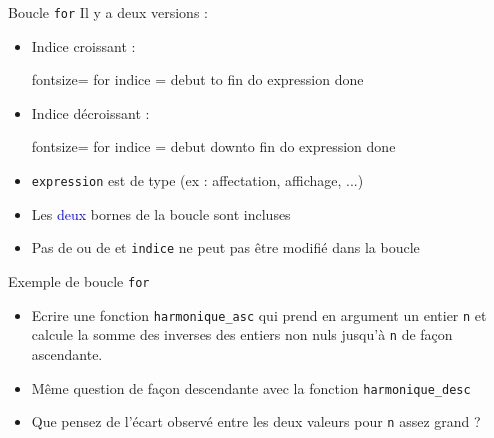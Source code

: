 \documentclass[10pt]{beamer}
\begin{document}
\begin{frame}[fragile]{\Ctitle}{\stitle}
	\begin{block}{Boucle  {\tt for}}
    Il y a deux versions :
    \begin{itemize}
    \item<1-> Indice croissant :
    \begin{OCaml*}{fontsize=\small}
for indice = debut to fin do
    expression
done
    \end{OCaml*}
    \item<2-> Indice décroissant :
    \begin{OCaml*}{fontsize=\small}
for indice = debut downto fin do
    expression
done
    \end{OCaml*}
    \end{itemize}
    \begin{itemize}
        \item<4-> {\tt expression} est de type  (ex : affectation, affichage, ...)
        \item<5-> Les \textcolor{blue}{deux} bornes de la boucle sont incluses
        \item<6-> Pas de  ou de  et {\tt indice} ne peut pas être modifié dans la boucle
    \end{itemize} 
    \end{block}
\end{frame}

\begin{frame}[fragile]{\Ctitle}{\stitle}
	\begin{exampleblock}{Exemple de boucle {\tt for}}
        \begin{itemize}
        \item<1->Ecrire une fonction {\tt harmonique\_asc} qui prend en argument un entier {\tt n} et calcule la somme des inverses des entiers non nuls jusqu'à {\tt n} de façon ascendante.
        \item<2-> Même question de façon descendante avec la fonction {\tt harmonique\_desc}
        \item<3-> Que pensez de l'écart observé entre les deux valeurs pour {\tt n} assez grand ?
        \end{itemize}
    \end{exampleblock}
\end{frame}
\end{document}
